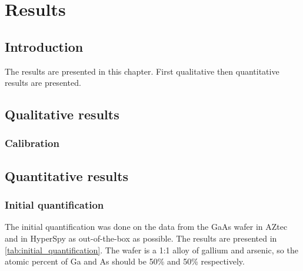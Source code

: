 \chapter{Results}




\section{Introduction}
\label{sec:results:intro}
The results are presented in this chapter.
First qualitative then quantitative results are presented.


\section{Qualitative results}
\label{sec:results:qualitative}


\subsection{Calibration}
\label{sec:results:qualitative:calibration}







\section{Quantitative results}
\label{sec:results:quantification}


\subsection{Initial quantification}
\label{sec:results:initial_quantification}

The initial quantification was done on the data from the GaAs wafer in AZtec and in HyperSpy as out-of-the-box as possible.
The results are presented in \cref{tab:initial_quantification}.
The wafer is a 1:1 alloy of gallium and arsenic, so the atomic percent of Ga and As should be 50\% and 50\% respectively.

